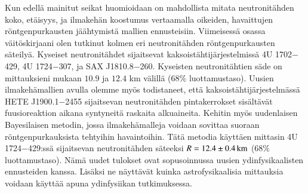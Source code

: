 \begin{otherlanguage}{finnish}
Kun edellä mainitut seikat huomioidaan on mahdollista mitata neutronitähden koko, etäisyys, ja ilmakehän koostumus vertaamalla oikeiden, havaittujen röntgenpurkausten jäähtymistä mallien ennusteisiin. 
Viimeisessä osassa väitöskirjaani olen tutkinut kolmen eri neutronitähden röntgenpurkausten säteilyä.
Kyseiset neutronitähdet sijaitsevat kaksois\-täh\-ti\-jär\-jes\-tel\-missä 4U 1702$-$429, 4U 1724$-$307, ja SAX J1810.8$-$260. 
Kyseisten neutronitähtien säde on mittauksieni mukaan $10.9$ ja $12.4$ km välillä ($68\%$ luottamustaso). 
Uusien ilmakehämallien avulla olemme myös todistaneet, että kaksois\-täh\-ti\-jär\-jes\-tel\-mässä HETE J1900.1$-$2455 sijaitsevan neutronitähden pintakerrokset sisältävät fuusioreaktion aikana syntyneitä raskaita alkuaineita. 
Kehitin myös uudenlaisen Bayesilaisen metodin, jossa ilmakehämalleja voidaan sovittaa suoraan röntgenpurkauksista tehtyihin havaintoihin. 
Tätä metodia käyttäen mittasin 4U 1724$-$429:ssä sijaitsevan neutronitähden säteeksi $R=12.4 \pm 0.4\, \mathrm{km}$ ($68\%$ luottamustaso). 
Nämä uudet tulokset ovat sopusoinnussa uusien ydinfysikaalisten ennusteiden kanssa. 
Lisäksi ne näyttävät kuinka astrofysikaalisia mittauksia voidaan käyttää apuna ydinfysiikan tutkimuksessa.

\end{otherlanguage}
